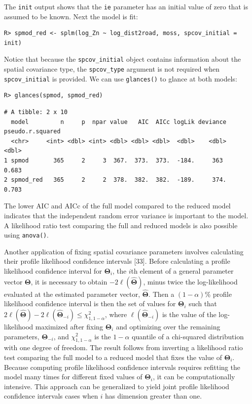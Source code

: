 \documentclass[10pt,letterpaper]{article}
\begin{document}
The \texttt{init} output shows that the \texttt{ie} parameter has an
initial value of zero that is assumed to be known. Next the model is
fit:

\begin{verbatim}
R> spmod_red <- splm(log_Zn ~ log_dist2road, moss, spcov_initial = init)
\end{verbatim}

Notice that because the \texttt{spcov\_initial} object contains
information about the spatial covariance type, the \texttt{spcov\_type}
argument is not required when \texttt{spcov\_initial} is provided. We
can use \texttt{glances()} to glance at both models:

\begin{verbatim}
R> glances(spmod, spmod_red)
\end{verbatim}

\begin{verbatim}
# A tibble: 2 x 10
  model         n     p  npar value   AIC  AICc logLik deviance pseudo.r.squared
  <chr>     <int> <dbl> <int> <dbl> <dbl> <dbl>  <dbl>    <dbl>            <dbl>
1 spmod       365     2     3  367.  373.  373.  -184.     363             0.683
2 spmod_red   365     2     2  378.  382.  382.  -189.     374.            0.703
\end{verbatim}

The lower AIC and AICc of the full model compared to the reduced model
indicates that the independent random error variance is important to the
model. A likelihood ratio test comparing the full and reduced models is
also possible using \texttt{anova()}.

Another application of fixing spatial covariance parameters involves
calculating their profile likelihood confidence intervals {[}33{]}.
Before calculating a profile likelihood confidence interval for
\(\boldsymbol{\Theta}_i\), the \(i\)th element of a general parameter
vector \(\boldsymbol{\Theta}\), it is necessary to obtain
\(-2\ell(\hat{\boldsymbol{\Theta}})\), minus twice the log-likelihood
evaluated at the estimated parameter vector,
\(\hat{\boldsymbol{\Theta}}\). Then a \((1 - \alpha)\)\% profile
likelihood confidence interval is then the set of values for
\(\boldsymbol{\Theta}_i\) such that
\(2\ell(\hat{\boldsymbol{\Theta}}) - 2\ell(\hat{\boldsymbol{\Theta}}_{-i}) \leq \chi^2_{1, 1 - \alpha}\),
where \(\ell(\hat{\boldsymbol{\Theta}}_{-i})\) is the value of the
log-likelihood maximized after fixing \(\boldsymbol{\Theta}_i\) and
optimizing over the remaining parameters, \(\boldsymbol{\Theta}_{-i}\),
and \(\chi^2_{1, 1 - \alpha}\) is the \(1 - \alpha\) quantile of a
chi-squared distribution with one degree of freedom. The result follows
from inverting a likelihood ratio test comparing the full model to a
reduced model that fixes the value of \(\boldsymbol{\Theta}_i\). Because
computing profile likelihood confidence intervals requires refitting the
model many times for different fixed values of
\(\boldsymbol{\Theta}_i\), it can be computationally intensive. This
approach can be generalized to yield joint profile likelihood confidence
intervals cases when \(i\) has dimension greater than one.
\end{document}
